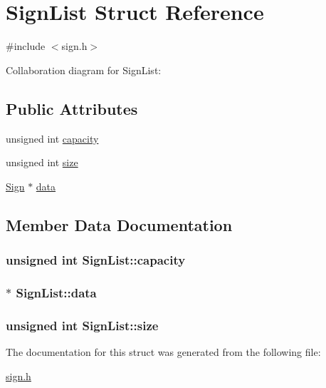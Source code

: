 \hypertarget{structSignList}{}\section{Sign\+List Struct Reference}
\label{structSignList}


{\ttfamily \#include $<$sign.\+h$>$}



Collaboration diagram for Sign\+List\+:
\subsection*{Public Attributes}
\begin{DoxyCompactItemize}
\item 
unsigned int \hyperlink{structSignList_a56d04de93571aa77cff50c4ee30f8682}{capacity}
\item 
unsigned int \hyperlink{structSignList_a1a62d68f9161254e618060ab4ffe2d89}{size}
\item 
\hyperlink{structSign}{Sign} $\ast$ \hyperlink{structSignList_aee3357bed55f987188d91160a631ae64}{data}
\end{DoxyCompactItemize}


\subsection{Member Data Documentation}
\subsubsection[{\texorpdfstring{capacity}{capacity}}]{\setlength{\rightskip}{0pt plus 5cm}unsigned int Sign\+List\+::capacity}\hypertarget{structSignList_a56d04de93571aa77cff50c4ee30f8682}{}\label{structSignList_a56d04de93571aa77cff50c4ee30f8682}
\subsubsection[{\texorpdfstring{data}{data}}]{$\ast$ Sign\+List\+::data}\hypertarget{structSignList_aee3357bed55f987188d91160a631ae64}{}\label{structSignList_aee3357bed55f987188d91160a631ae64}
\subsubsection[{\texorpdfstring{size}{size}}]{\setlength{\rightskip}{0pt plus 5cm}unsigned int Sign\+List\+::size}\hypertarget{structSignList_a1a62d68f9161254e618060ab4ffe2d89}{}\label{structSignList_a1a62d68f9161254e618060ab4ffe2d89}


The documentation for this struct was generated from the following file\+:\begin{DoxyCompactItemize}
\item 
\hyperlink{sign_8h}{sign.\+h}\end{DoxyCompactItemize}
